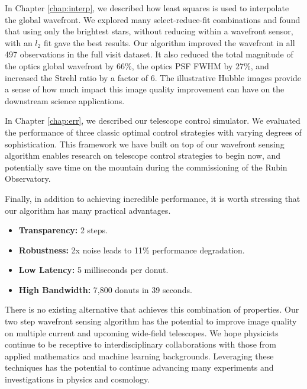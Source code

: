 In Chapter \ref{chap:interp}, we described how least squares is used to interpolate the global wavefront. We explored many select-reduce-fit combinations and found that using only the brightest stars, without reducing within a wavefront sensor, with an $l_2$ fit gave the best results. Our algorithm improved the wavefront in all 497 observations in the full visit dataset. It also reduced the total magnitude of the optics global wavefront by 66\%, the optics PSF FWHM by 27\%, and increased the Strehl ratio by a factor of 6. The illustrative Hubble images provide a sense of how much impact this image quality improvement can have on the downstream science applications. 

In Chapter \ref{chap:err}, we described our telescope control simulator. We evaluated the performance of three classic optimal control strategies with varying degrees of sophistication. This framework we have built on top of our wavefront sensing algorithm enables research on telescope control strategies to begin now, and potentially save time on the mountain during the commissioning of the Rubin Observatory. 

Finally, in addition to achieving incredible performance, it is worth stressing that our algorithm has many practical advantages.

\begin{itemize}
\item \textbf{Transparency:} 2 steps.
\item \textbf{Robustness:} 2x noise leads to 11\% performance degradation.
\item \textbf{Low Latency:} 5 milliseconds per donut.
\item \textbf{High Bandwidth:} 7,800 donuts in 39 seconds.
\end{itemize}

\noindent There is no existing alternative that achieves this combination of properties. Our two step wavefront sensing algorithm has the potential to improve image quality on multiple current and upcoming wide-field telescopes. We hope physicists continue to be receptive to interdisciplinary collaborations with those from applied mathematics and machine learning backgrounds. Leveraging these techniques has the potential to continue advancing many experiments and investigations in physics and cosmology. 
